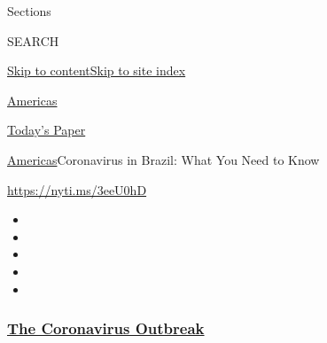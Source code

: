 Sections

SEARCH

\protect\hyperlink{site-content}{Skip to
content}\protect\hyperlink{site-index}{Skip to site index}

\href{https://www.nytimes3xbfgragh.onion/section/world/americas}{Americas}

\href{https://myaccount.nytimes3xbfgragh.onion/auth/login?response_type=cookie\&client_id=vi}{}

\href{https://www.nytimes3xbfgragh.onion/section/todayspaper}{Today's
Paper}

\href{/section/world/americas}{Americas}\textbar{}Coronavirus in Brazil:
What You Need to Know

\url{https://nyti.ms/3eeU0hD}

\begin{itemize}
\item
\item
\item
\item
\item
\end{itemize}

\hypertarget{the-coronavirus-outbreak}{%
\subsubsection{\texorpdfstring{\href{https://www.nytimes3xbfgragh.onion/news-event/coronavirus?name=styln-coronavirus-national\&region=TOP_BANNER\&block=storyline_menu_recirc\&action=click\&pgtype=Article\&impression_id=4ef19c10-f1d0-11ea-bd53-232e4c613195\&variant=undefined}{The
Coronavirus
Outbreak}}{The Coronavirus Outbreak}}\label{the-coronavirus-outbreak}}

